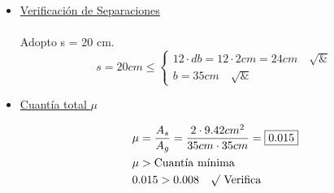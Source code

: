 \begin{enumerate}
\begin{itemize}
\item \underline{Verificación de Separaciones}\\
\\
Adopto s = 20 cm.\\
\[ s = 20cm \leq \left\{ \begin{array}{ll}
         12 \cdot db = 12 \cdot 2cm = 24cm \quad \surd &\\
         b = 35cm \quad \surd & \end{array} \right. \] 

\item \underline{Cuantía total $\mu$}

\begin{align*}
& \mu = \frac{A_s}{A_g} = \frac{2 \cdot 9.42cm^2}{35cm \cdot 35cm} = \framebox{0.015} \\
& \mu > \text{Cuantía mínima} \\
& 0.015 > 0.008 \quad \surd \text{ Verifica}
\end{align*}

\end{itemize}
\end{enumerate}